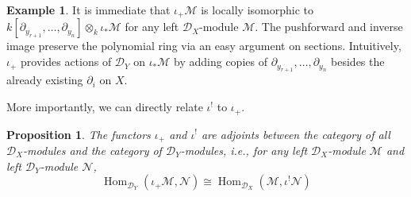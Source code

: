 \documentclass[11pt, a4paper]{article}
\newtheorem{proposition}[theorem]{Proposition}
\theoremstyle{definition}
\newtheorem{example}[theorem]{Example}
\newcommand{\Hom}[0]{\operatorname{Hom}}
\begin{document}
    \begin{example}\label{exp-push-module-local}
        It is immediate that $\iota_+\mathcal M$ is locally isomorphic to $k[\partial_{y_{r+1}},\dots,\partial_{y_n}]\otimes_k\iota_*\mathcal M$ for any left $\mathcal D_X$-module $\mathcal M$. The pushforward and inverse image preserve the polynomial ring via an easy argument on sections. Intuitively, $\iota_+$ provides actions of $\mathcal D_Y$ on $\iota_*\mathcal M$ by adding copies of $\partial_{y_{r+1}},\dots,\partial_{y_n}$ besides the already existing $\partial_i$ on $X$.
    \end{example}
    More importantly, we can directly relate $\iota^!$ to $\iota_+$.
    \begin{proposition}\label{prop-adjunction}
        The functors $\iota_+$ and $\iota^!$ are adjoints between the category of all $\mathcal D_X$-modules and the category of $\mathcal D_Y$-modules, i.e., for any left $\mathcal D_X$-module $\mathcal M$ and left $\mathcal D_Y$-module $\mathcal N$,
        \[\Hom_{\mathcal D_Y}(\iota_+\mathcal M,\mathcal N)\cong\Hom_{\mathcal D_X}(\mathcal M, \iota^!\mathcal N)\]
    \end{proposition}
\end{document}
